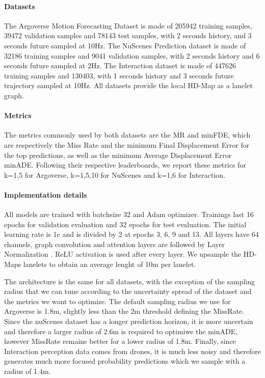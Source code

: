 \documentclass[letterpaper, 10 pt, conference]{ieeeconf}
\begin{document}
\paragraph{Datasets}
The Argoverse Motion Forecasting Dataset \cite{chang2019argoverse} is made of 205942 training samples, 39472 validation samples and 78143 test samples, with 2 seconds history, and 3 seconds future sampled at 10Hz. The NuScenes Prediction dataset \cite{caesar2020nuscenes} is made of 32186 training samples and 9041 validation samples, with 2 seconds history and 6 seconds future sampled at 2Hz. The Interaction dataset is made of 447626 training samples and 130403, with 1 seconds history and 3 seconds future trajectory sampled at 10Hz. All datasets provide the local HD-Map as a lanelet graph.

\paragraph{Metrics} The metrics commonly used by both datasets are the MR and minFDE, which are respectively the Miss Rate and the minimum Final Displacement Error for the top  predictions, as well as the minimum Average Displacement Error minADE. Following their respective leaderboards, we report these metrics for k=1,5 for Argoverse, k=1,5,10 for NuScenes and k=1,6 for Interaction.



\paragraph{Implementation details} All models are trained with batchsize 32 and Adam optimizer. Trainings last 16 epochs for validation evaluation and 32 epochs for test evaluation. The initial learning rate is 1e and is divided by 2 at epochs 3, 6, 9 and 13. All layers have 64 channels, graph convolution and attention layers are followed by Layer Normalization \cite{ba2016layer}. ReLU activation is used after every layer.
We upsample the HD-Maps lanelets to obtain an average lenght of 10m per lanelet. 

The architecture is the same for all datasets, with the exception of the sampling radius  that we can tune according to the uncertainty spread of the dataset and the metrics we want to optimize.  The default sampling radius we use for Argoverse is 1.8m, slightly less than the 2m threshold defining the MissRate. Since the nuScenes dataset has a longer prediction horizon, it is more uncertain  and therefore a larger radius of 2.6m is required to optimiwe the minADE, however MissRate remains better for a lower radius of 1.8m. Finally, since Interaction perception data comes from drones, it is much less noisy and therefore generates much more focused probability predictions which we sample with a radius of 1.4m.
\end{document}
